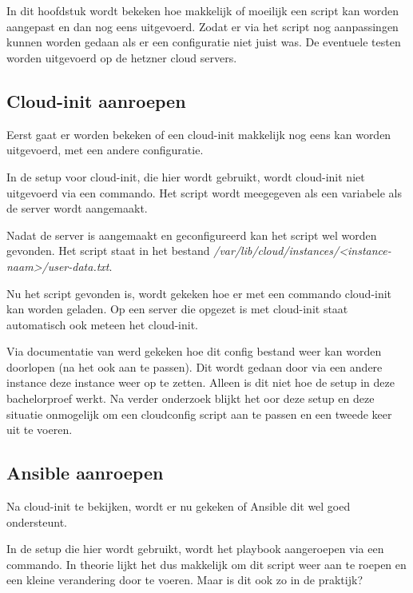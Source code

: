 \chapter{}
\label{ch:naopstarten}
In dit hoofdstuk wordt bekeken hoe makkelijk of moeilijk een script kan worden aangepast en dan nog eens uitgevoerd. Zodat er via het script nog aanpassingen kunnen worden gedaan als er een configuratie niet juist was. De eventuele testen worden uitgevoerd op de hetzner cloud servers.

\section{Cloud-init aanroepen}
Eerst gaat er worden bekeken of een cloud-init makkelijk nog eens kan worden uitgevoerd, met een andere configuratie. 

In de setup voor cloud-init, die hier wordt gebruikt, wordt cloud-init niet uitgevoerd via een commando. Het script wordt meegegeven als een variabele als de server wordt aangemaakt. 

Nadat de server is aangemaakt en geconfigureerd kan het script wel worden gevonden. Het script staat in het bestand \textit{/var/lib/cloud/instances/<instance-naam>/user-data.txt}.

Nu het script gevonden is, wordt gekeken hoe er met een commando cloud-init kan worden geladen. Op een server die opgezet is met cloud-init staat automatisch ook meteen het cloud-init.

Via documentatie van \autocite{scaleaway} werd gekeken hoe dit config bestand weer kan worden doorlopen (na het ook aan te passen). Dit wordt gedaan door via een andere instance deze instance weer op te zetten. Alleen is dit niet hoe de setup in deze bachelorproef werkt. Na verder onderzoek blijkt het oor deze setup en deze situatie  onmogelijk om een cloudconfig script aan te passen en een tweede keer uit te voeren.

\section{Ansible aanroepen}
Na cloud-init te bekijken, wordt er nu gekeken of Ansible dit wel goed ondersteunt. 

In de setup die hier wordt gebruikt, wordt het playbook aangeroepen via een commando. In theorie lijkt het dus makkelijk om dit script weer aan te roepen en een kleine verandering door te voeren. Maar is dit ook zo in de praktijk?

